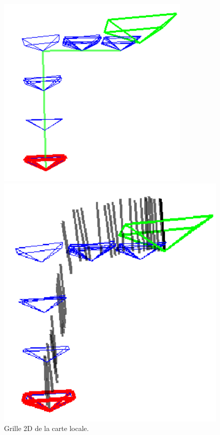 \documentclass[11pt]{article}
\begin{document}
        \begin{figure}[tbp]
          \centering
          \begin{minipage}[t]{0.4\textwidth}
            \includegraphics[width=\textwidth]{Test1.png}    
            \caption{Grille 2D de la carte locale.}
            \label{fig:Test1}
          \end{minipage}
          \hfill 
          \begin{minipage}[t]{0.4\textwidth}
            \includegraphics[width=\textwidth]{Test2.png}    

\end{minipage}
\end{figure}
\end{document}
